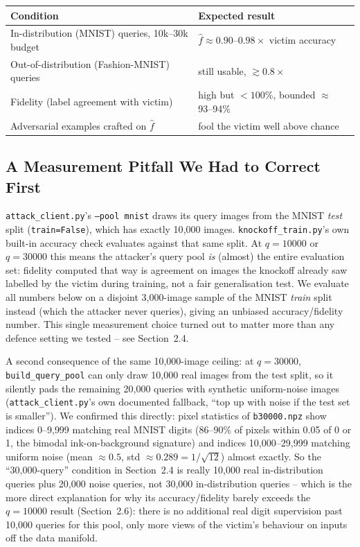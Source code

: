 \documentclass[11pt]{article}
\begin{document}
\begin{center}
\begin{tabular}{@{}lll}
\toprule
\textbf{Condition} & \textbf{Expected result} \\
\midrule
In-distribution (MNIST) queries, 10k--30k budget & $\hat f \approx 0.90$--$0.98\times$ victim accuracy \\
Out-of-distribution (Fashion-MNIST) queries & still usable, $\gtrsim 0.8\times$ \\
Fidelity (label agreement with victim) & high but $<100\%$, bounded $\approx$93--94\% \\
Adversarial examples crafted on $\hat f$ & fool the victim well above chance \\
\bottomrule
\end{tabular}
\end{center}

\subsection{A Measurement Pitfall We Had to Correct First}

\texttt{attack\_client.py}'s \texttt{--pool mnist} draws its query images from
the MNIST \emph{test} split (\texttt{train=False}), which has exactly 10{,}000
images. \texttt{knockoff\_train.py}'s own built-in accuracy check evaluates
against that same split. At $q=10000$ or $q=30000$ this means the attacker's
query pool \emph{is} (almost) the entire evaluation set: fidelity computed
that way is agreement on images the knockoff already saw labelled by the
victim during training, not a fair generalisation test. We evaluate all
numbers below on a disjoint 3{,}000-image sample of the MNIST \emph{train}
split instead (which the attacker never queries), giving an unbiased
accuracy/fidelity number. This single measurement choice turned out to
matter more than any defence setting we tested -- see Section~2.4.

A second consequence of the same 10{,}000-image ceiling: at $q=30000$,
\texttt{build\_query\_pool} can only draw 10{,}000 real images from the test
split, so it silently pads the remaining 20{,}000 queries with synthetic
uniform-noise images (\texttt{attack\_client.py}'s own documented fallback,
``top up with noise if the test set is smaller''). We confirmed this
directly: pixel statistics of \texttt{b30000.npz} show indices 0--9{,}999
matching real MNIST digits (86--90\% of pixels within 0.05 of 0 or 1, the
bimodal ink-on-background signature) and indices 10{,}000--29{,}999 matching
uniform noise (mean $\approx 0.5$, std $\approx 0.289 = 1/\sqrt{12}$) almost
exactly. So the ``30{,}000-query'' condition in Section~2.4 is really
10{,}000 real in-distribution queries plus 20{,}000 noise queries, not
30{,}000 in-distribution queries -- which is the more direct explanation
for why its accuracy/fidelity barely exceeds the $q=10000$ result (Section~2.6):
there is no additional real digit supervision past 10{,}000 queries for this
pool, only more views of the victim's behaviour on inputs off the data
manifold.
\end{document}
